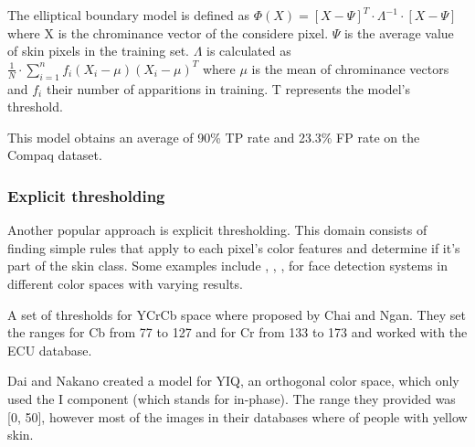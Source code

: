 \documentclass[12pt]{report}
\begin{document}
	The elliptical boundary model is defined as $ \Phi(X) = [X - \Psi]^T\cdot \Lambda^{-1} \cdot [X - \Psi]  $ where X is the chrominance vector of the considere pixel. $\Psi$ is the average value of skin pixels in the training set. $\Lambda$ is calculated as $ \frac{1}{N} \cdot \sum_{i=1}^{n}f_i(X_i-\mu)(X_i-\mu)^T$ where $\mu$ is the mean of chrominance vectors and $f_i$ their number of apparitions in training. T represents the model's threshold.
	
	This model obtains an average of 90\% TP rate and 23.3\% FP rate on the Compaq dataset.
	
	\subsubsection{Explicit thresholding}
	Another popular approach is explicit thresholding. This domain consists of finding simple rules that apply to each pixel's color features and determine if it's part of the skin class. Some examples include \cite{rgb_threshold}, \cite{cr_cb_threshold}, \cite{yiq_threshold}, \cite{i_threshold} for face detection systems in different color spaces with varying results. 
 	
 	A set of thresholds for YCrCb space where proposed by Chai and Ngan\cite{cr_cb_threshold}. They set the ranges for Cb from 77 to 127 and for Cr from 133 to 173 and worked with the ECU database.
 	
 	Dai and Nakano\cite{yiq_threshold} created a model for YIQ, an orthogonal color space, which only used the I component (which stands for in-phase). The range they provided was [0, 50], however most of the images in their databases where of people with yellow skin.
 	
\end{document}
